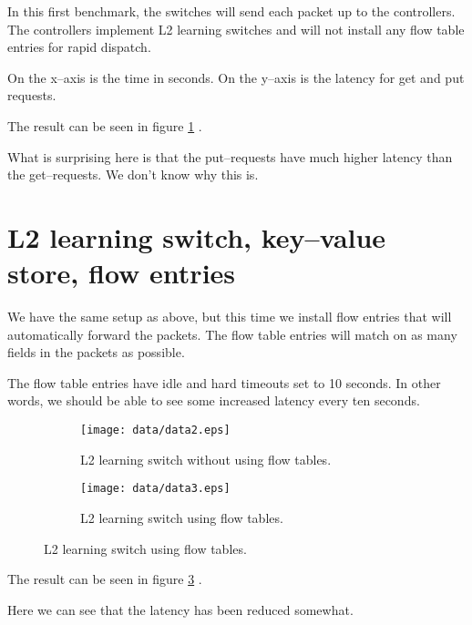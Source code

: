 In this first benchmark, the switches will send each packet up to the
controllers.  The controllers implement L2 learning switches and will not
install any flow table entries for rapid dispatch.

On the x--axis is the time in seconds.  On the y--axis is the latency for
get and put requests.

The result can be seen in figure \ref{benchmark:l2.learning.switch.no.flows} 
.  

What is surprising here is that the put--requests have much higher latency
than the get--requests. We don't know why this is.

\section{L2 learning switch, key--value store, flow entries}

We have the same setup as above, but this time we install flow entries that
will automatically forward the packets.  The flow table entries will match
on as many fields in the packets as possible.

The flow table entries have idle and hard timeouts set to 10 seconds.
In other words, we should be able to see some increased latency every ten
seconds.

\begin{figure}
  \centering
  \begin{subfigure}{\textwidth}
    \centering
    \texttt{[image: data/data2.eps]}
    \caption{L2 learning switch without using flow tables.}
    \label{benchmark:l2.learning.switch.no.flows}
  \end{subfigure}

  \centering
  \begin{subfigure}{\textwidth}
    \centering
    \texttt{[image: data/data3.eps]}
    \caption{L2 learning switch using flow tables.}
    \label{benchmark:l2.learning.switch.with.flows}
  \end{subfigure}
\end{figure}

The result can be seen in figure \ref{benchmark:l2.learning.switch.with.flows}
.

Here we can see that the latency has been reduced somewhat.


